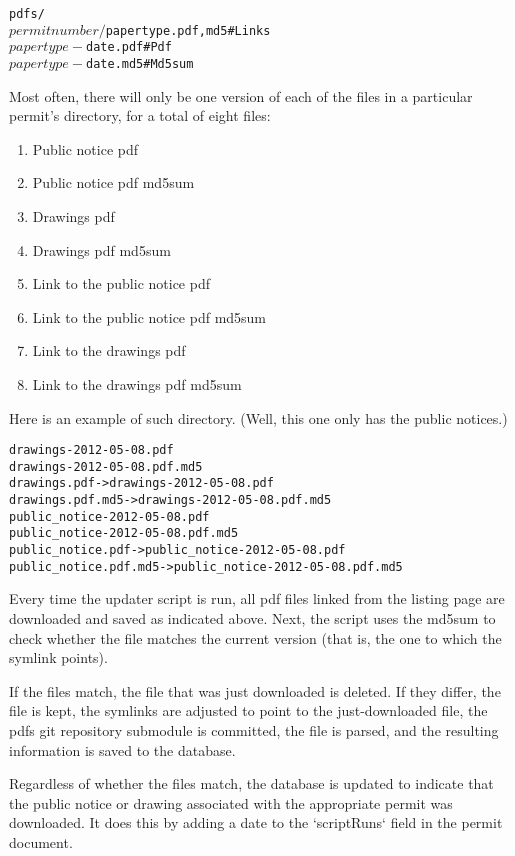 \documentclass{article}
\begin{document}
\begin{alltt}
pdfs/
  ${permitnumber}/
    ${papertype}.{pdf,md5} # Links
    ${papertype}-${date}.pdf # Pdf
    ${papertype}-${date}.md5 # Md5sum
\end{alltt}

Most often, there will only be one version of each of the files in a
particular permit's directory, for a total of eight files:
\begin{enumerate}
\item Public notice pdf
\item Public notice pdf md5sum
\item Drawings pdf
\item Drawings pdf md5sum
\item Link to the public notice pdf
\item Link to the public notice pdf md5sum
\item Link to the drawings pdf
\item Link to the drawings pdf md5sum
\end{enumerate}

Here is an example of such directory. (Well, this one only has the public
notices.)

\begin{alltt}
drawings-2012-05-08.pdf
drawings-2012-05-08.pdf.md5
drawings.pdf -> drawings-2012-05-08.pdf
drawings.pdf.md5 -> drawings-2012-05-08.pdf.md5
public\_notice-2012-05-08.pdf
public\_notice-2012-05-08.pdf.md5
public\_notice.pdf -> public_notice-2012-05-08.pdf
public\_notice.pdf.md5 -> public_notice-2012-05-08.pdf.md5
\end{alltt}

Every time the updater script is run, all pdf files linked from the listing
page are downloaded and saved as indicated above. Next, the script uses the
md5sum to check whether the file matches the current version (that is, the
one to which the symlink points).

If the files match, the file that was just downloaded is deleted. If they
differ, the file is kept, the symlinks are adjusted to point to the
just-downloaded file, the pdfs git repository submodule is committed,
the file is parsed, and the resulting information is saved to the database.

Regardless of whether the files match, the database is updated to indicate
that the public notice or drawing associated with the appropriate permit
was downloaded. It does this by adding a date to the `scriptRuns` field
in the permit document.
\end{document}
